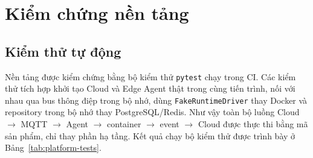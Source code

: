 \section{Kiểm chứng nền tảng}

\subsection{Kiểm thử tự động}

Nền tảng được kiểm chứng bằng bộ kiểm thử \texttt{pytest} chạy trong CI. Các
kiểm thử tích hợp khởi tạo Cloud và Edge Agent thật trong cùng tiến trình, nối
với nhau qua bus thông điệp trong bộ nhớ, dùng \texttt{FakeRuntimeDriver} thay
Docker và repository trong bộ nhớ thay PostgreSQL/Redis. Như vậy toàn bộ luồng
Cloud $\rightarrow$ MQTT $\rightarrow$ Agent $\rightarrow$ container $\rightarrow$
event $\rightarrow$ Cloud được thực thi bằng mã sản phẩm, chỉ thay phần hạ tầng.
Kết quả chạy bộ kiểm thử được trình bày ở Bảng~\ref{tab:platform-tests}.

